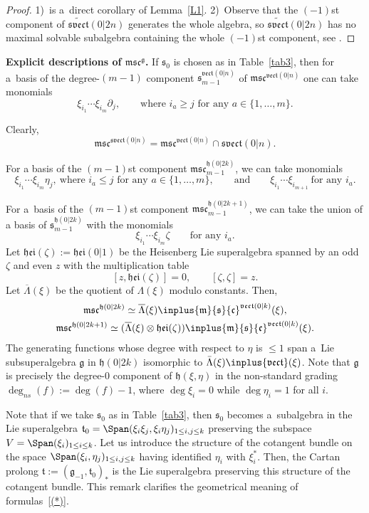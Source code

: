 \documentclass[10pt,a4paper]{amsart}
\newcommand{\del}{\partial}
\newcommand {\fc} {{\mathfrak{c}}}
\newcommand {\fg} {{\mathfrak{g}}} %
\newcommand {\fh} {{\mathfrak{h}}}
\newcommand {\fhei} {{\mathfrak{hei}}}
\newcommand {\fm} {{\mathfrak{m}}}
\newcommand {\fs} {{\mathfrak{s}}}
\newcommand {\fsvect} {{\mathfrak{svect}}}
\newcommand {\ft} {{\mathfrak{t}}}
\newcommand {\fvect} {{\mathfrak{vect}}} %
\newcommand {\<} [2] {{\left.\vphantom{#2}\right.^{#1\!}\!{#2}}}
\numberwithin{equation}{section}
\begin{document}
\begin{proof}
1)~is a~direct corollary of Lemma~\ref{L1}.
2)~Observe that the $(-1)$st component of $\widetilde{\fsvect}(0|2n)$ generates the whole algebra, so $\widetilde{\fsvect}(0|2n)$ has no maximal solvable subalgebra containing the whole $(-1)$st component, see \cite[Lemma~2.4]{BLM}.
\end{proof}


{\bf Explicit descriptions of $\boldsymbol{\fm\fs\fc^\fg}$.}
If $\fs_0$ is chosen as in Table~\ref{tab3}, then for a~basis of the degree-$(m-1)$ component $\fs_{m-1}^{\fvect(0|n)}$ of $\fm\fs\fc^{\fvect(0|n)}$ one can take monomials
\[
\xi_{i_1}\cdots\xi_{i_m}\del_j, \qquad \text{where $i_a\geq j$ for any $a\in\{1, \dots, m\}$}.
\]

Clearly,
\[
\fm\fs\fc^{\fsvect(0|n)}=\fm\fs\fc^{\fvect(0|n)}\cap\fsvect(0|n).
\]

For a basis of the $(m-1)$st component $\fm\fs\fc_{m-1}^{\fh(0|2k)}$, we can take monomials
\[
\xi_{i_1}\cdots\xi_{i_m}\eta_j, \  \text{where $i_a\leq j$ for any $a\in\{1, \dots, m\}$},  \qquad \text{and}\qquad
\xi_{i_1}\cdots\xi_{i_{m+1}} \  \text{for any $i_a$}.
\]

For a~basis of the $(m-1)$st component $\fm\fs\fc_{m-1}^{\fh(0|2k+1)}$, we can take the union of a basis of $\fs_{m-1}^{\fh(0|2k)}$ with the monomials
\[
\xi_{i_1}\cdots\xi_{i_m}\zeta\qquad \text{for any $i_a$}.
\]
Let $\fhei(\zeta):=\fhei(0|1)$ be the Heisenberg Lie superalgebra spanned by an odd $\zeta$ and even $z$ with the multiplication table
\[
[z, \fhei(\zeta)]=0,\qquad [\zeta, \zeta]=z.
\]
Let $\overline{\Lambda}(\xi)$ be the quotient of $\Lambda(\xi)$ modulo constants. Then,
\begin{gather}
\fm\fs\fc^{\fh(0|2k)}\simeq \overline{\Lambda}(\xi)\inplus\fm\fs\fc^{\fvect(0|k)}(\xi),\nonumber\\
\fm\fs\fc^{\fh(0|2k+1)}\simeq (\overline{\Lambda}(\xi)\otimes\fhei(\zeta))\inplus\fm\fs\fc^{\fvect(0|k)}(\xi).\label{(*)}
\end{gather}
The generating functions whose degree with respect to $\eta$ is $\leq 1$ span a~Lie subsuperalgebra $\fg$ in $\fh(0|2k)$ isomorphic to $\bar\Lambda(\xi)\inplus\fvect(\xi)$. Note that $\fg$ is precisely the degree-0 component of $\fh(\xi,\eta)$ in the non-standard grading $\deg_{ns} (f):=\deg (f)-1$, where $\deg \xi_i=0$ while $\deg \eta_i=1$ for all $i$.

Note that if we take $\fs_0$ as in Table~\ref{tab3}, then $\fs_0$ becomes a~subalgebra in the Lie superalgebra $\ft_0=\Span(\xi_i\xi_j, \xi_i\eta_j)_{1\leq i, j\leq k}$ preserving the subspace $V=\Span(\xi_i)_{1\leq i\leq k}$. Let us introduce the structure of the cotangent bundle on the space $\Span(\xi_i, \eta_j)_{1\leq i, j\leq k}$ having identified $\eta_i$ with $\xi_i^*$. Then, the Cartan prolong $\ft:=(\fg_{-1},\ft_0)_*$ is the Lie superalgebra preserving this structure of the cotangent bundle.
This remark clarifies the geometrical meaning of formulas~\eqref{(*)}.
\end{document}
